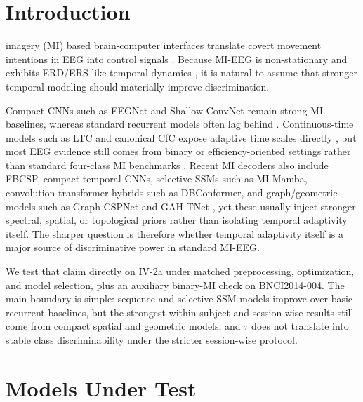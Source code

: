 \documentclass[journal]{IEEEtran}
\begin{document}
\IEEEpeerreviewmaketitle

\section{Introduction}

 imagery (MI) based brain-computer interfaces translate covert movement intentions in EEG into control signals \cite{wolpaw2002brain}. Because MI-EEG is non-stationary and exhibits ERD/ERS-like temporal dynamics \cite{pfurtscheller1999erd}, it is natural to assume that stronger temporal modeling should materially improve discrimination.

Compact CNNs such as EEGNet and Shallow ConvNet remain strong MI baselines, whereas standard recurrent models often lag behind \cite{lawhern2018eegnet,schirrmeister2017deep}. Continuous-time models such as LTC and canonical CfC expose adaptive time scales directly \cite{hasani2021ltc,hasani2022cfc}, but most EEG evidence still comes from binary or efficiency-oriented settings rather than standard four-class MI benchmarks \cite{chen2025nsa}. Recent MI decoders also include FBCSP, compact temporal CNNs, selective SSMs such as MI-Mamba, convolution-transformer hybrids such as DBConformer, and graph/geometric models such as Graph-CSPNet and GAH-TNet \cite{ang2008fbcsp,ang2012fbcsp2a2b,ingolfsson2020eegtcnet,elouahidi2024simpleconv,guo2025mimamba,wang2025dbconformer,li2024ctnet,han2024eegcct,ju2022graphcspnet,han2025gahtnet}, yet these usually inject stronger spectral, spatial, or topological priors rather than isolating temporal adaptivity itself. The sharper question is therefore whether temporal adaptivity itself is a major source of discriminative power in standard MI-EEG.

We test that claim directly on IV-2a under matched preprocessing, optimization, and model selection, plus an auxiliary binary-MI check on BNCI2014-004. The main boundary is simple: sequence and selective-SSM models improve over basic recurrent baselines, but the strongest within-subject and session-wise results still come from compact spatial and geometric models, and $\tau$ does not translate into stable class discriminability under the stricter session-wise protocol.

\section{Models Under Test}
\end{document}
